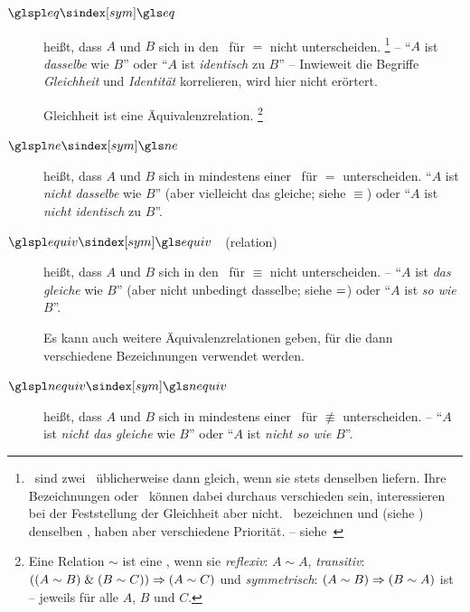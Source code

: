 \begin{description}
	\item[$\glsSym{eq}$~~\emph{}]\label{def:Gleichheit}
	 heißt, dass $A$ und $B$ sich in den \interessierendenEigenschaften\ für $=$ nicht unterscheiden.%
	\footnote{%
		\textZB\ sind zwei \Junktoren\ üblicherweise dann gleich, wenn sie stets denselben \emph{\Wahrheitswert} liefern.
		Ihre Bezeichnungen oder \Symbole\ können dabei durchaus verschieden sein, interessieren bei der Feststellung der Gleichheit aber nicht.
		\textZB\ bezeichnen \chrqt{$\metaandsym$} und \chrqt{$\srand$} (siehe ) denselben \Operator, haben aber verschiedene Priorität. -- siehe~
	}
	-- \enquote{$A$ ist \emph{dasselbe} wie $B$} oder \enquote{$A$ ist \emph{identisch} zu $B$}
	-- Inwieweit die Begriffe \emph{Gleichheit} und \emph{Identität} korrelieren, wird hier nicht erörtert.

	Gleichheit ist eine Äquivalenzrelation.%
	\footnote{%
		Eine Relation $\sim$ ist eine , wenn sie \emph{reflexiv}: $A \sim A$, \emph{transitiv}: $((A \sim B) \;\&\; (B \sim C)) \Rightarrow (A \sim C)$ und \emph{symmetrisch}: $(A \sim B) \Rightarrow (B \sim A)$ ist -- jeweils für alle $A$, $B$ und $C$.
	}
	\item[$\glsSym{ne}$~~\emph{}]\label{def:Ungleichheit}
	 heißt, dass $A$ und $B$ sich in mindestens einer \interessierendenEigenschaft\ für $=$ unterscheiden. \enquote{$A$ ist \emph{nicht dasselbe} wie $B$} (aber vielleicht das gleiche; siehe $\equiv$) oder \enquote{$A$ ist \emph{nicht identisch} zu $B$}.
	\item[$\glsSym{equiv}$~~\emph{}(relation)]\label{def:Äquivalenz}
	 heißt, dass $A$ und $B$ sich in den \interessierendenEigenschaften\ für $\equiv$ nicht unterscheiden.
	-- \enquote{$A$ ist \emph{das gleiche} wie $B$} (aber nicht unbedingt dasselbe; siehe $=$) oder \enquote{$A$ ist \emph{so wie} $B$}.

	Es kann auch weitere Äquivalenzrelationen geben, für die dann verschiedene Bezeichnungen verwendet werden.
	\item[$\glsSym{nequiv}$~~\emph{}]\label{def:Kontravalenz}
	 heißt, dass $A$ und $B$ sich in mindestens einer \interessierendenEigenschaft\ für $\nequiv$ unterscheiden.
	-- \enquote{$A$ ist \emph{nicht das gleiche} wie $B$} oder \enquote{$A$ ist \emph{nicht so wie} $B$}.
\end{description}

